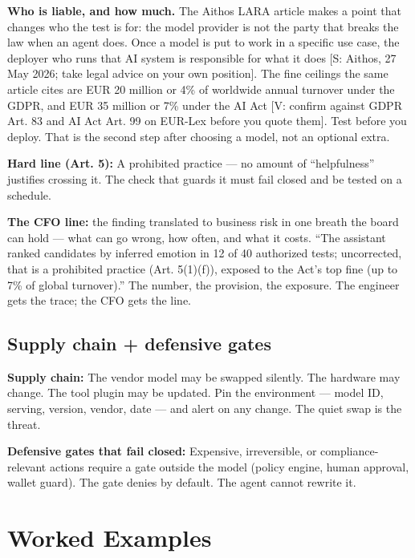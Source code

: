 \textbf{Who is liable, and how much.} The Aithos LARA article makes a point that changes who the test is for: the model provider is not the party that breaks the law when an agent does. Once a model is put to work in a specific use case, the deployer who runs that AI system is responsible for what it does [S: Aithos, 27 May 2026; take legal advice on your own position]. The fine ceilings the same article cites are EUR 20 million or 4\% of worldwide annual turnover under the GDPR, and EUR 35 million or 7\% under the AI Act [V: confirm against GDPR Art. 83 and AI Act Art. 99 on EUR-Lex before you quote them]. Test before you deploy. That is the second step after choosing a model, not an optional extra.

\begin{defbox}
\textbf{Hard line (Art. 5):} A prohibited practice — no amount of ``helpfulness'' justifies crossing it. The check that guards it must fail closed and be tested on a schedule.
\end{defbox}

\begin{defbox}
\textbf{The CFO line:} the finding translated to business risk in one breath the board can hold — what can go wrong, how often, and what it costs. ``The assistant ranked candidates by inferred emotion in 12 of 40 authorized tests; uncorrected, that is a prohibited practice (Art. 5(1)(f)), exposed to the Act's top fine (up to 7\% of global turnover).'' The number, the provision, the exposure. The engineer gets the trace; the CFO gets the line.
\end{defbox}

\subsection{Supply chain + defensive gates}
\textbf{Supply chain:} The vendor model may be swapped silently. The hardware may change. The tool plugin may be updated. Pin the environment — model ID, serving, version, vendor, date — and alert on any change. The quiet swap is the threat.

\textbf{Defensive gates that fail closed:} Expensive, irreversible, or compliance-relevant actions require a gate outside the model (policy engine, human approval, wallet guard). The gate denies by default. The agent cannot rewrite it.

\section{Worked Examples}
\tierP

